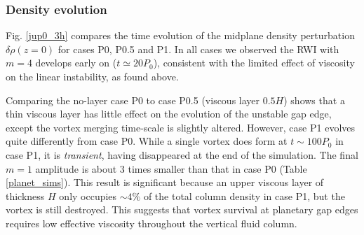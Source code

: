 \subsubsection{Density evolution}%

Fig. \ref{jup0_3h} compares the time evolution of the midplane density
perturbation $\delta\rho(z=0)$ for cases P0, P0.5 and P1. In 
all cases we observed the RWI with $m=4$ develops early on ($t\simeq20P_0$),
consistent with the limited effect of viscosity on the linear
instability, as found above.  

Comparing the no-layer case P0 to case P0.5 (viscous layer $0.5H$)
shows that a thin viscous layer has little effect on the
evolution of the unstable gap edge, except the vortex merging
time-scale is slightly altered. However, case P1 evolves quite
differently from case P0. While a single vortex does form at
$t\sim100P_0$ in case P1, it is \emph{transient}, having disappeared at the end of
the simulation. The final $m=1$ amplitude is about 3 times smaller
than that in case P0 (Table \ref{planet_sims}). This result is
significant because an upper viscous layer of 
thickness $H$ only occupies $\sim4\%$ of the total column density
in case P1, but the vortex is still destroyed. This suggests that vortex
survival at planetary gap edges requires low effective viscosity
throughout the vertical fluid column. 

